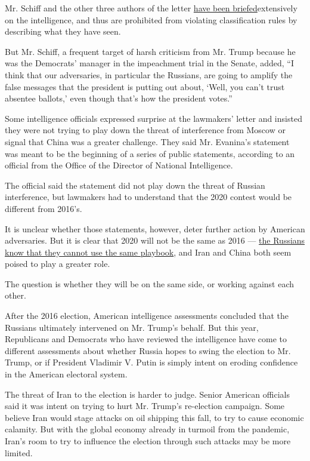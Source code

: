 Mr. Schiff and the other three authors of the letter
\href{https://www.nytimes.com/2020/02/20/us/politics/russian-interference-trump-democrats.html}{have
been briefed}extensively on the intelligence, and thus are prohibited
from violating classification rules by describing what they have seen.

But Mr. Schiff, a frequent target of harsh criticism from Mr. Trump
because he was the Democrats' manager in the impeachment trial in the
Senate, added, ``I think that our adversaries, in particular the
Russians, are going to amplify the false messages that the president is
putting out about, `Well, you can't trust absentee ballots,' even though
that's how the president votes.''

Some intelligence officials expressed surprise at the lawmakers' letter
and insisted they were not trying to play down the threat of
interference from Moscow or signal that China was a greater challenge.
They said Mr. Evanina's statement was meant to be the beginning of a
series of public statements, according to an official from the Office of
the Director of National Intelligence.

The official said the statement did not play down the threat of Russian
interference, but lawmakers had to understand that the 2020 contest
would be different from 2016's.

It is unclear whether those statements, however, deter further action by
American adversaries. But it is clear that 2020 will not be the same as
2016 ---
\href{https://www.nytimes.com/2020/03/10/us/politics/election-interference-briefing-trump.html}{the
Russians know that they cannot use the same playbook}, and Iran and
China both seem poised to play a greater role.

The question is whether they will be on the same side, or working
against each other.

After the 2016 election, American intelligence assessments concluded
that the Russians ultimately intervened on Mr. Trump's behalf. But this
year, Republicans and Democrats who have reviewed the intelligence have
come to different assessments about whether Russia hopes to swing the
election to Mr. Trump, or if President Vladimir V. Putin is simply
intent on eroding confidence in the American electoral system.

The threat of Iran to the election is harder to judge. Senior American
officials said it was intent on trying to hurt Mr. Trump's re-election
campaign. Some believe Iran would stage attacks on oil shipping this
fall, to try to cause economic calamity. But with the global economy
already in turmoil from the pandemic, Iran's room to try to influence
the election through such attacks may be more limited.

